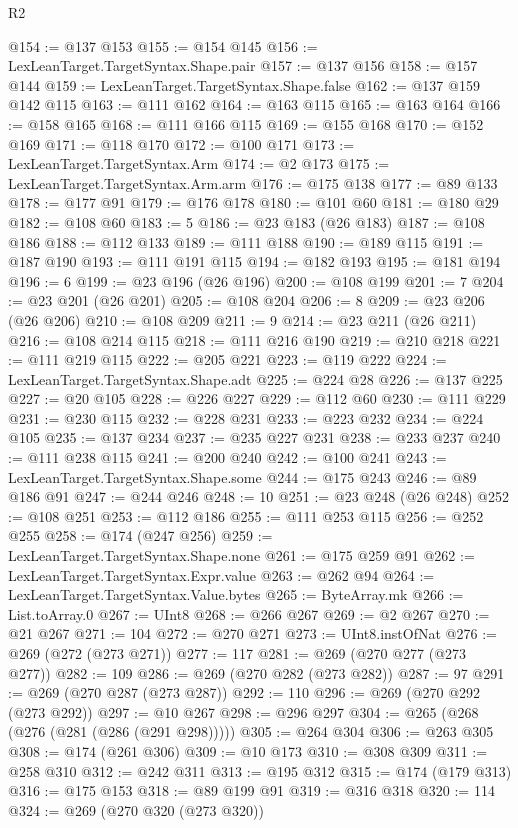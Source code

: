 \begin{lexlean}{R2}
\begin{coremodule}
{{{{{{{{{{{{{{{{{{{{{{{{{{{{{{{{{{{{{{{{{{{{{{{{{{{{{{{{{{{{{{{{{{{{{{{{{{{{{{{{{{{{{{{{{{{{{{{{{{{{{{{{{{{{{{{{{{{{{{{{{{{{{{{{{{{{{{{{{{{{@154 := @137 @153
@155 := @154 @145
@156 := LexLeanTarget.TargetSyntax.Shape.pair
@157 := @137 @156
@158 := @157 @144
@159 := LexLeanTarget.TargetSyntax.Shape.false
@162 := @137 @159 @142 @115
@163 := @111 @162
@164 := @163 @115
@165 := @163 @164
@166 := @158 @165
@168 := @111 @166 @115
@169 := @155 @168
@170 := @152 @169
@171 := @118 @170
@172 := @100 @171
@173 := LexLeanTarget.TargetSyntax.Arm
@174 := @2 @173
@175 := LexLeanTarget.TargetSyntax.Arm.arm
@176 := @175 @138
@177 := @89 @133
@178 := @177 @91
@179 := @176 @178
@180 := @101 @60
@181 := @180 @29
@182 := @108 @60
@183 := 5
@186 := @23 @183 (@26 @183)
@187 := @108 @186
@188 := @112 @133
@189 := @111 @188
@190 := @189 @115
@191 := @187 @190
@193 := @111 @191 @115
@194 := @182 @193
@195 := @181 @194
@196 := 6
@199 := @23 @196 (@26 @196)
@200 := @108 @199
@201 := 7
@204 := @23 @201 (@26 @201)
@205 := @108 @204
@206 := 8
@209 := @23 @206 (@26 @206)
@210 := @108 @209
@211 := 9
@214 := @23 @211 (@26 @211)
@216 := @108 @214 @115
@218 := @111 @216 @190
@219 := @210 @218
@221 := @111 @219 @115
@222 := @205 @221
@223 := @119 @222
@224 := LexLeanTarget.TargetSyntax.Shape.adt
@225 := @224 @28
@226 := @137 @225
@227 := @20 @105
@228 := @226 @227
@229 := @112 @60
@230 := @111 @229
@231 := @230 @115
@232 := @228 @231
@233 := @223 @232
@234 := @224 @105
@235 := @137 @234
@237 := @235 @227 @231
@238 := @233 @237
@240 := @111 @238 @115
@241 := @200 @240
@242 := @100 @241
@243 := LexLeanTarget.TargetSyntax.Shape.some
@244 := @175 @243
@246 := @89 @186 @91
@247 := @244 @246
@248 := 10
@251 := @23 @248 (@26 @248)
@252 := @108 @251
@253 := @112 @186
@255 := @111 @253 @115
@256 := @252 @255
@258 := @174 (@247 @256)
@259 := LexLeanTarget.TargetSyntax.Shape.none
@261 := @175 @259 @91
@262 := LexLeanTarget.TargetSyntax.Expr.value
@263 := @262 @94
@264 := LexLeanTarget.TargetSyntax.Value.bytes
@265 := ByteArray.mk
@266 := List.toArray.{0}
@267 := UInt8
@268 := @266 @267
@269 := @2 @267
@270 := @21 @267
@271 := 104
@272 := @270 @271
@273 := UInt8.instOfNat
@276 := @269 (@272 (@273 @271))
@277 := 117
@281 := @269 (@270 @277 (@273 @277))
@282 := 109
@286 := @269 (@270 @282 (@273 @282))
@287 := 97
@291 := @269 (@270 @287 (@273 @287))
@292 := 110
@296 := @269 (@270 @292 (@273 @292))
@297 := @10 @267
@298 := @296 @297
@304 := @265 (@268 (@276 (@281 (@286 (@291 @298)))))
@305 := @264 @304
@306 := @263 @305
@308 := @174 (@261 @306)
@309 := @10 @173
@310 := @308 @309
@311 := @258 @310
@312 := @242 @311
@313 := @195 @312
@315 := @174 (@179 @313)
@316 := @175 @153
@318 := @89 @199 @91
@319 := @316 @318
@320 := 114
@324 := @269 (@270 @320 (@273 @320))
}}}}}}}}}}}}}}}}}}}}}}}}}}}}}}}}}}}}}}}}}}}}}}}}}}}}}}}}}}}}}}}}}}}}}}}}}}}}}}}}}}}}}}}}}}}}}}}}}}}}}}}}}}}}}}}}}}}}}}}}}}}}}}}}}}}}}}}}}}}}
\end{coremodule}
\end{lexlean}
